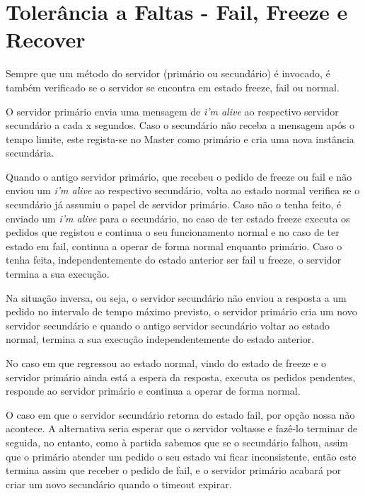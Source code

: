 \section{Tolerância a Faltas - Fail, Freeze e Recover}

Sempre que um método do servidor (primário ou secundário) é invocado, é também verificado se o servidor se encontra em estado freeze, fail ou normal.

O servidor primário envia uma mensagem de \textit{i’m alive} ao respectivo servidor secundário a cada x segundos. Caso o secundário não receba a mensagem após o tempo limite, este regista-se no Master como primário e cria uma nova instância secundária.

Quando o antigo servidor primário, que recebeu o pedido de freeze ou fail e não enviou um \textit{i’m alive} ao respectivo secundário, volta ao estado normal verifica se o secundário já assumiu o papel de servidor primário. Caso não o tenha feito, é enviado um \textit{i’m alive} para o secundário, no caso de ter estado freeze executa os pedidos que registou e continua o seu funcionamento normal e no caso de ter estado em fail, continua a operar de forma normal enquanto primário. Caso o tenha feita, independentemente do estado anterior ser fail u freeze, o servidor termina a sua execução.

Na situação inversa, ou seja, o servidor secundário não enviou a resposta a um pedido no intervalo de tempo máximo previsto, o servidor primário cria um novo servidor secundário e quando o antigo servidor secundário voltar ao estado normal, termina a sua execução independentemente do estado anterior. 

No caso em que regressou ao estado normal, vindo do estado de freeze e o servidor primário ainda está a espera da resposta, executa os pedidos pendentes, responde ao servidor primário e continua a operar de forma normal. 

O caso em que o servidor secundário retorna do estado fail, por opção nossa não acontece.
A alternativa seria esperar que o servidor voltasse e fazê-lo terminar de seguida, no entanto, como à partida sabemos que se o secundário falhou, assim que o primário atender um pedido o seu estado vai ficar inconsistente, então este termina assim que receber o pedido de fail, e o servidor primário acabará por criar um novo secundário quando o timeout expirar. 

